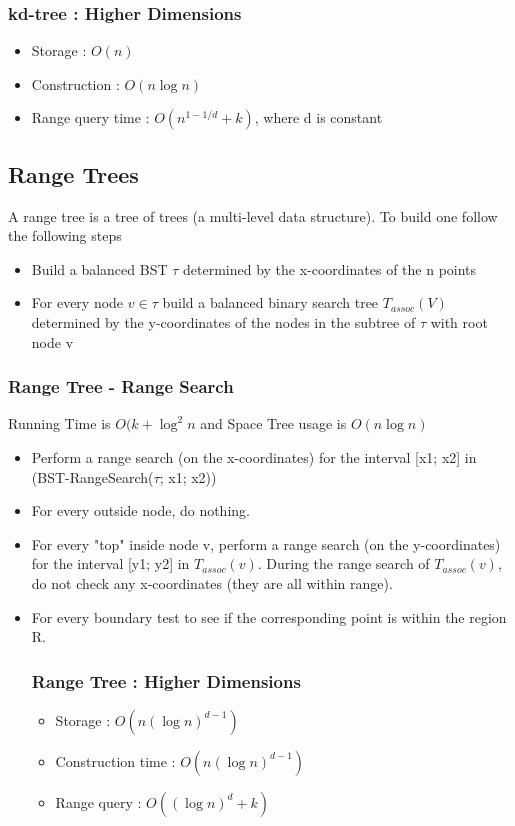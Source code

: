 \documentclass{article}
\begin{document}
\subsubsection*{kd-tree : Higher Dimensions }
\begin{itemize}
\item Storage : \(O(n)\)
\item Construction : \(O(n \log n)\)
\item Range query time : \(O(n^{1-1/d} + k)\), where d is constant 
\end{itemize}

\subsection*{Range Trees}
A range tree is a tree of trees (a multi-level data structure). To build one follow the following steps
\begin{itemize}
\item Build a balanced BST \(\tau\) determined by the x-coordinates of the n points
\item For every node \(v \in \tau\) build a balanced binary search tree \(T_{assoc}(V)\) determined by the y-coordinates of the nodes in the subtree of \(\tau\) with root node v
\end{itemize}

\subsubsection*{Range Tree - Range Search}
Running Time is \(O(k + \log^2 n \) and Space Tree usage is \(O(n \log n)\)
\begin{itemize}
\item Perform a range search (on the x-coordinates) for the interval [x1; x2]
in (BST-RangeSearch(\(\tau\); x1; x2))
\item For every outside node, do nothing.
\item For every "top" inside node v, perform a range search (on the
y-coordinates) for the interval [y1; y2] in \(T_{assoc} (v)\). During the range
search of \(T_{assoc} (v)\), do not check any x-coordinates (they are all within
range).
\item For every boundary test to see if the corresponding point is
within the region R.

\subsubsection*{Range Tree : Higher Dimensions}
\begin{itemize}
\item Storage : \(O(n (\log n)^{d-1})\)
\item Construction time : \(O(n (\log n)^{d -1})\)
\item Range query  : \(O((\log n)^d + k) \) 
\end{itemize}
\end{itemize}
\end{document}
